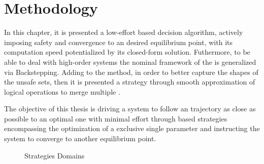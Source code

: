 
%


\chapter{Methodology}
\label{cha:methodology}

\glsresetall %

In this chapter, it is presented a low-effort  based decision algorithm, actively imposing safety and convergence to an desired equilibrium point, with its computation speed potentialized by its closed-form solution. Futhermore, to be able to deal with high-order systems the nominal framework of the  is generalized via Backstepping. Adding to the  method, in order to better capture the shapes of the unsafe sets, then it is presented a strategy through smooth approximation of logical operations to merge multiple .   \par

The objective of this thesis is driving a system to follow an trajectory as close as possible to an optimal one with minimal effort through  based strategies encompassing the optimization of a exclusive single parameter and instructing the system to converge to another equilibrium point.

\def\firstcircle{( 90:1.5) circle (2cm)} %
\def\secondcircle{(210:1.5) circle (2cm)}
\def\thirdcircle{(330:1.5) circle (2cm)}

\begin{figure}[!h]
\centering
{}
\caption{Strategies Domains}
\label{fig:Strategies_Domains}
\end{figure}




